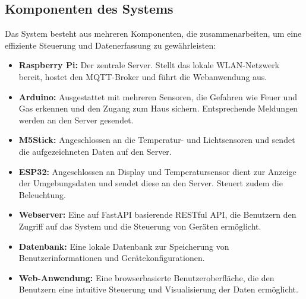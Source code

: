 \documentclass[12pt, letterpaper]{article}
\begin{document}
\subsection{Komponenten des Systems}
\par Das System besteht aus mehreren Komponenten, die zusammenarbeiten, um eine effiziente Steuerung und Datenerfassung zu gewährleisten: 
\begin{itemize} 
  \item \textbf{Raspberry Pi:} Der zentrale Server. Stellt das lokale WLAN-Netzwerk bereit, hostet den MQTT-Broker und führt die Webanwendung aus. 
  \item \textbf{Arduino:} Ausgestattet mit mehreren Sensoren, die Gefahren wie Feuer und Gas erkennen und den Zugang zum Haus sichern. Entsprechende Meldungen werden an den Server gesendet.
  \item \textbf{M5Stick:} Angeschlossen an die Temperatur- und Lichtsensoren und sendet die aufgezeichneten Daten auf den Server. 
  \item \textbf{ESP32:} Angeschlossen an Display und Temperatursensor dient zur Anzeige der Umgebungsdaten und sendet diese an den Server. Steuert zudem die Beleuchtung.
  \item \textbf{Webserver:} Eine auf FastAPI basierende RESTful API, die Benutzern den Zugriff auf das System und die Steuerung von Geräten ermöglicht. 
  \item \textbf{Datenbank:} Eine lokale Datenbank zur Speicherung von Benutzerinformationen und Gerätekonfigurationen.
  \item \textbf{Web-Anwendung:} Eine browserbasierte Benutzeroberfläche, die den Benutzern eine intuitive Steuerung und Visualisierung der Daten ermöglicht. 
\end{itemize}
\end{document}
